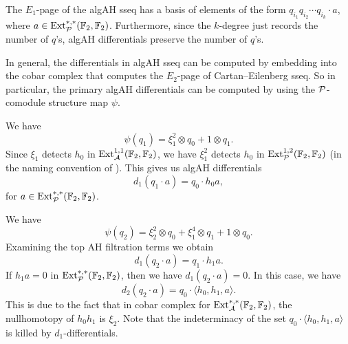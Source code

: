 \begin{rmk}
  The $E_1$-page of the algAH sseq has a basis of elements of the form
  $q_{i_1}q_{i_2}\cdots q_{i_k} \cdot a$, where $a\in \Ext_{\P}^{*,*}(\F_2, \F_2)$.
  Furthermore, since the $k$-degree just records the number of $q$'s,
  algAH differentials preserve the number of $q$'s.
\end{rmk}




In general, the differentials in algAH sseq can be computed by embedding into the cobar complex that computes the $E_2$-page of Cartan--Eilenberg sseq. So in particular, the primary algAH differentials can be computed by using the $\P$-comodule structure map $\psi$.

\begin{exm}
  We have 
  $$\psi(q_1) = \xi_1^2 \otimes q_0 + 1 \otimes q_1.$$
  Since $\xi_1$ detects $h_0$ in $\Ext_{\A}^{1,1}(\F_2, \F_2)$,
  we have $\xi_1^2$ detects $h_0$ in  $\Ext_{\P}^{1,2}(\F_2, \F_2)$ (in the naming convention of ). This gives us algAH differentials
  $$d_1 (q_1\cdot a) =  q_0 \cdot h_0 a,$$
  for $a \in \Ext_{\P}^{*,*}(\F_2, \F_2)$.
\end{exm}

\begin{exm}
  We have
  $$\psi(q_2) = \xi_2^2 \otimes q_0 + \xi_1^4 \otimes q_1 + 1 \otimes q_0.$$
  Examining the top AH filtration terms we obtain
  $$d_1 (q_2 \cdot a) =  q_1 \cdot h_1 a.$$
  If $h_1 a = 0$ in $\Ext_{\P}^{*,*}(\F_2, \F_2)$, then we have $d_1 (q_2\cdot a) = 0$.
  In this case, we have 
  $$d_2 (q_2\cdot a) = q_0 \cdot \langle h_0, h_1, a \rangle.$$
  This is due to the fact that in cobar complex for $\Ext_{\A}^{*,*}(\F_2, \F_2)$, the nullhomotopy of $h_0h_1$ is $\xi_2$. Note that the indeterminacy of the set $q_0 \cdot \langle h_0, h_1, a \rangle$ is killed by $d_1$-differentials.
\end{exm}

